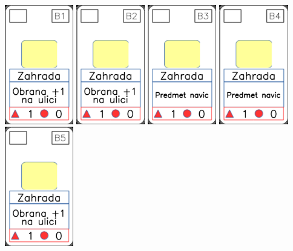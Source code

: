 \documentclass[a4paper]{article}
\begin{document}
	\includegraphics[width=3.0cm]{img-2_20}
	\includegraphics[width=3.0cm]{img-2_21}
	\includegraphics[width=3.0cm]{img-2_22}
	\includegraphics[width=3.0cm]{img-2_23}
	\includegraphics[width=3.0cm]{img-2_24}
\end{document}
